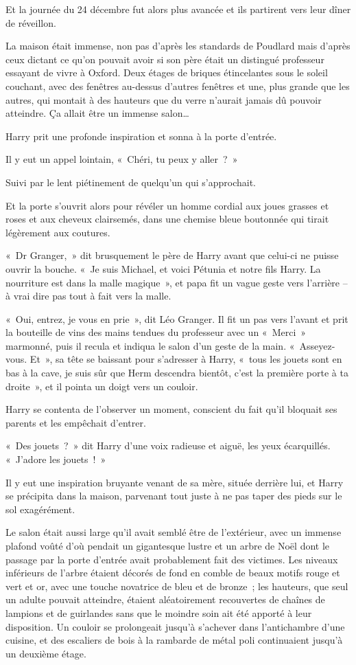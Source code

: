 Et la journée du 24 décembre fut alors plus avancée et ils partirent vers leur dîner de réveillon.

\later

La maison était immense, non pas d'après les standards de Poudlard mais d'après ceux dictant ce qu'on pouvait avoir si son père était un distingué professeur essayant de vivre à Oxford. Deux étages de briques étincelantes sous le soleil couchant, avec des fenêtres au-dessus d'autres fenêtres et une, plus grande que les autres, qui montait à des hauteurs que du verre n'aurait jamais dû pouvoir atteindre. Ça allait être un immense salon…

Harry prit une profonde inspiration et sonna à la porte d'entrée.

Il y eut un appel lointain, «~Chéri, tu peux y aller~?~»

Suivi par le lent piétinement de quelqu'un qui s'approchait.

Et la porte s'ouvrit alors pour révéler un homme cordial aux joues grasses et roses et aux cheveux clairsemés, dans une chemise bleue boutonnée qui tirait légèrement aux coutures.

«~Dr Granger,~» dit brusquement le père de Harry avant que celui-ci ne puisse ouvrir la bouche. «~Je suis Michael, et voici Pétunia et notre fils Harry. La nourriture est dans la malle magique~», et papa fit un vague geste vers l'arrière -- à vrai dire pas tout à fait vers la malle.

«~Oui, entrez, je vous en prie~», dit Léo Granger. Il fit un pas vers l'avant et prit la bouteille de vins des mains tendues du professeur avec un «~Merci~» marmonné, puis il recula et indiqua le salon d'un geste de la main. «~Asseyez-vous. Et~», sa tête se baissant pour s'adresser à Harry, «~tous les jouets sont en bas à la cave, je suis sûr que Herm descendra bientôt, c'est la première porte à ta droite~», et il pointa un doigt vers un couloir.

Harry se contenta de l'observer un moment, conscient du fait qu'il bloquait ses parents et les empêchait d'entrer.

«~Des jouets~?~» dit Harry d'une voix radieuse et aiguë, les yeux écarquillés. «~J'adore les jouets~!~»

Il y eut une inspiration bruyante venant de sa mère, située derrière lui, et Harry se précipita dans la maison, parvenant tout juste à ne pas taper des pieds sur le sol exagérément.

Le salon était aussi large qu'il avait semblé être de l'extérieur, avec un immense plafond voûté d'où pendait un gigantesque lustre et un arbre de Noël dont le passage par la porte d'entrée avait probablement fait des victimes. Les niveaux inférieurs de l'arbre étaient décorés de fond en comble de beaux motifs rouge et vert et or, avec une touche novatrice de bleu et de bronze~; les hauteurs, que seul un adulte pouvait atteindre, étaient aléatoirement recouvertes de chaînes de lampions et de guirlandes sans que le moindre soin ait été apporté à leur disposition. Un couloir se prolongeait jusqu'à s'achever dans l'antichambre d'une cuisine, et des escaliers de bois à la rambarde de métal poli continuaient jusqu'à un deuxième étage.

